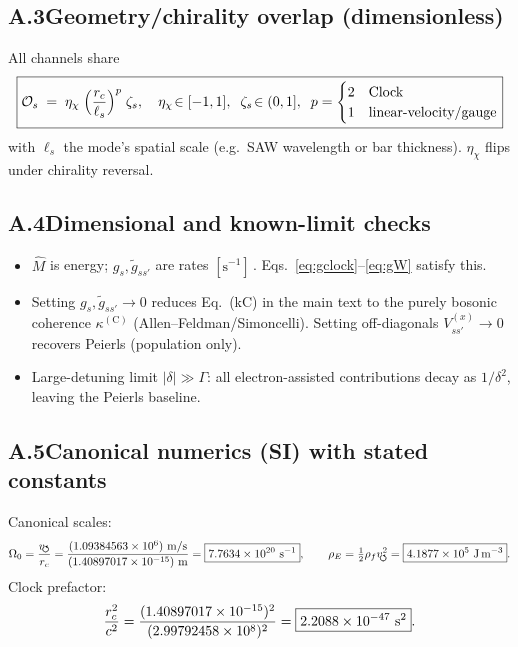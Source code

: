 \documentclass[aps,prb,preprint,amsmath,amssymb]{revtex4-2} %
\newcommand{\vswirlVal}{1.09384563\times10^{6}} %
\newcommand{\rcVal}{1.40897017\times10^{-15}} %
\newcommand{\vswirl}{v_{\!\mkern-2mu\scriptstyle\boldsymbol{\circlearrowleft}}}
\newcommand{\rc}{r_c}
\newcommand{\rhoF}{\rho_{f}}
\newcommand{\rhoE}{\rho_{E}}
\begin{document}
    \subsection*{A.3\quad Geometry/chirality overlap (dimensionless)}
    All channels share
    \begin{align}
        \boxed{%
            \mathcal O_s \;=\; \eta_\chi \;\Big(\frac{\rc}{\ell_s}\Big)^{p}\;\zeta_s,\quad
            \eta_\chi\!\in[-1,1],\;\; \zeta_s\!\in(0,1],\;\; p=\begin{cases}2 & \text{Clock}\\ 1 & \text{linear-velocity/gauge}\end{cases}}
        \label{eq:overlap}
    \end{align}
    with \(\ell_s\) the mode’s spatial scale (e.g.\ SAW wavelength or bar thickness). \(\eta_\chi\) flips under chirality reversal.

    \subsection*{A.4\quad Dimensional and known-limit checks}
    \begin{itemize}
        \item \(\hat M\) is energy; \(g_s,\tilde g_{ss'}\) are rates \([\mathrm{s^{-1}}]\)\,. Eqs.~\eqref{eq:gclock}–\eqref{eq:gW} satisfy this.
        \item Setting \(g_s,\tilde g_{ss'}\!\to\!0\) reduces Eq.~(kC) in the main text to the purely bosonic coherence \(\kappa^{(\mathrm C)}\) (Allen–Feldman/Simoncelli). Setting off-diagonals \(V_{ss'}^{(x)}\!\to\!0\) recovers Peierls (population only).
        \item Large-detuning limit \(|\delta|\!\gg\!\Gamma\): all electron-assisted contributions decay as \(1/\delta^2\), leaving the Peierls baseline.
    \end{itemize}

    \subsection*{A.5\quad Canonical numerics (SI) with stated constants}
    Canonical scales:
    \[
        \OmegaZero=\frac{\vswirl}{\rc}
        =\frac{(\vswirlVal)\ \mathrm{m/s}}{(\rcVal)\ \mathrm{m}}
        =\boxed{7.7634\times10^{20}\ \mathrm{s^{-1}}},
        \qquad
        \rhoE=\tfrac12\rhoF\vswirl^2
        =\boxed{4.1877\times10^{5}\ \mathrm{J\,m^{-3}}}.
    \]
    Clock prefactor:
    \[
        \frac{\rc^2}{c^2}
        =\frac{(\rcVal)^2}{(\cVal)^2}
        =\boxed{2.2088\times10^{-47}\ \mathrm{s^2}}.
    \]
\end{document}

